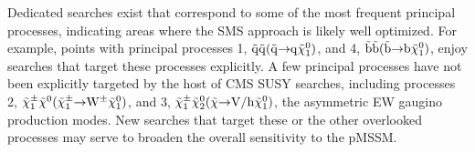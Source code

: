 Dedicated searches exist that correspond to some of the most frequent principal processes, indicating areas where the SMS approach is likely well optimized. For example, points with principal processes 1, $\tilde{\rm q}\tilde{\rm q}(\tilde{\rm q} \hspace{-1mm}\rightarrow \hspace{-1mm}{\rm q}\tilde{\chi}_{1}^{0})$, and 4, $\tilde{\rm b}\tilde{\rm b}(\tilde{\rm b} \hspace{-1mm}\rightarrow \hspace{-1mm}{\rm b}\tilde{\chi}_{1}^{0})$, enjoy searches that target these processes explicitly.   A few principal processes have not been explicitly targeted by the host of CMS SUSY searches, including processes 2, $\tilde{\chi}^{\pm}_{1}\tilde{\chi}^{0}(\tilde{\chi}^{\pm}_{1} \hspace{-1mm}\rightarrow \hspace{-1mm}{\rm W}^{\pm}\tilde{\chi}_{1}^{0})$, and 3, $\tilde{\chi}^{\pm}_{1}\tilde{\chi}^{0}_{2}(\tilde{\chi} \hspace{-1mm}\rightarrow \hspace{-1mm}{\rm V/h}\tilde{\chi}_{1}^{0})$, the asymmetric EW gaugino production modes. New searches that target these or the other overlooked processes may serve to broaden the overall sensitivity to the pMSSM.

